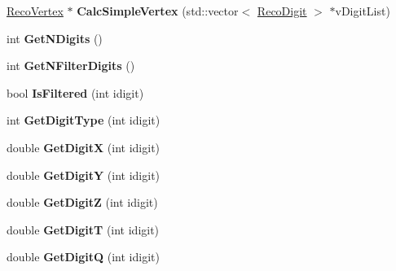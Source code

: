 \begin{DoxyCompactItemize}
\item 
\hypertarget{classVertexGeometry_a7e8e9251a3c47688ba54c942416bf2e3}{
\hyperlink{classRecoVertex}{RecoVertex} $\ast$ {\bfseries CalcSimpleVertex} (std::vector$<$ \hyperlink{classRecoDigit}{RecoDigit} $>$ $\ast$vDigitList)}
\label{classVertexGeometry_a7e8e9251a3c47688ba54c942416bf2e3}

\item 
\hypertarget{classVertexGeometry_a15716dd74083e985ff6a60160adcf01b}{
int {\bfseries GetNDigits} ()}
\label{classVertexGeometry_a15716dd74083e985ff6a60160adcf01b}

\item 
\hypertarget{classVertexGeometry_a55c6663325dadb26600618c28dded497}{
int {\bfseries GetNFilterDigits} ()}
\label{classVertexGeometry_a55c6663325dadb26600618c28dded497}

\item 
\hypertarget{classVertexGeometry_aa59b350bd91ef0cbcff246c39a726428}{
bool {\bfseries IsFiltered} (int idigit)}
\label{classVertexGeometry_aa59b350bd91ef0cbcff246c39a726428}

\item 
\hypertarget{classVertexGeometry_ac01a580d673a95d8f534a5f4e65592b7}{
int {\bfseries GetDigitType} (int idigit)}
\label{classVertexGeometry_ac01a580d673a95d8f534a5f4e65592b7}

\item 
\hypertarget{classVertexGeometry_a523bcf337cbab4a2e36934e1f70cfe87}{
double {\bfseries GetDigitX} (int idigit)}
\label{classVertexGeometry_a523bcf337cbab4a2e36934e1f70cfe87}

\item 
\hypertarget{classVertexGeometry_aa3742471e098741489cfac41ab9cdb99}{
double {\bfseries GetDigitY} (int idigit)}
\label{classVertexGeometry_aa3742471e098741489cfac41ab9cdb99}

\item 
\hypertarget{classVertexGeometry_a72dd6074b8100870aeee8cc52c308980}{
double {\bfseries GetDigitZ} (int idigit)}
\label{classVertexGeometry_a72dd6074b8100870aeee8cc52c308980}

\item 
\hypertarget{classVertexGeometry_aadf7fd1ade32fd7058a767f643d93ce8}{
double {\bfseries GetDigitT} (int idigit)}
\label{classVertexGeometry_aadf7fd1ade32fd7058a767f643d93ce8}

\item 
\hypertarget{classVertexGeometry_acb9ef2d2b900b496f6ba0a2783dc497d}{
double {\bfseries GetDigitQ} (int idigit)}
\label{classVertexGeometry_acb9ef2d2b900b496f6ba0a2783dc497d}


\end{DoxyCompactItemize}
